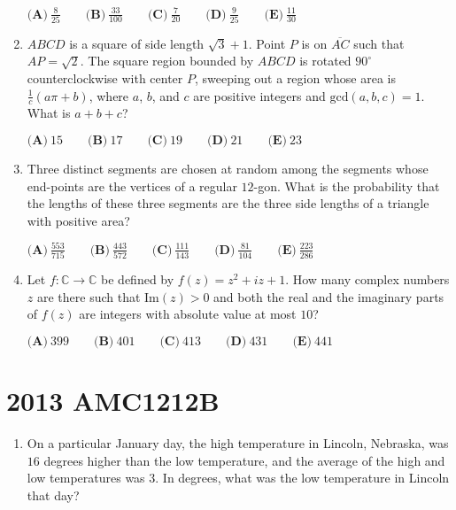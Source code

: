 \documentclass{article}
\begin{document}
\begin{enumerate}[label=\arabic*., itemsep=0.5em]
$ \textbf{(A)} \ \frac{8}{25} \qquad \textbf{(B)} \ \frac{33}{100} \qquad \textbf{(C)} \ \frac{7}{20} \qquad \textbf{(D)} \ \frac{9}{25} \qquad \textbf{(E)} \ \frac{11}{30}$\par \vspace{0.5em}\item $ ABCD$ is a square of side length $ \sqrt{3} + 1 $. Point $ P $ is on $ \overline{AC} $ such that $ AP = \sqrt{2} $. The square region bounded by $ ABCD $ is rotated $ 90^{\circ} $ counterclockwise with center $ P $, sweeping out a region whose area is $ \frac{1}{c} (a \pi + b) $, where $a $, $b$, and $ c $ are positive integers and $ \text{gcd}(a,b,c) = 1 $. What is $ a + b + c $?

$\textbf{(A)} \ 15 \qquad \textbf{(B)} \ 17 \qquad \textbf{(C)} \ 19 \qquad \textbf{(D)} \ 21 \qquad \textbf{(E)} \ 23 $\par \vspace{0.5em}\item Three distinct segments are chosen at random among the segments whose end-points are the vertices of a regular $12$-gon. What is the probability that the lengths of these three segments are the three side lengths of a triangle with positive area?

$ \textbf{(A)} \ \frac{553}{715} \qquad \textbf{(B)} \ \frac{443}{572} \qquad \textbf{(C)} \ \frac{111}{143} \qquad \textbf{(D)} \ \frac{81}{104} \qquad \textbf{(E)} \ \frac{223}{286}$\par \vspace{0.5em}\item Let $f : \mathbb{C} \to \mathbb{C} $ be defined by $ f(z) = z^2 + iz + 1 $. How many complex numbers $z $ are there such that $ \text{Im}(z) > 0 $ and both the real and the imaginary parts of $f(z)$ are integers with absolute value at most $ 10 $?

$ \textbf{(A)} \ 399 \qquad \textbf{(B)} \ 401 \qquad \textbf{(C)} \ 413 \qquad \textbf{(D)} \ 431 \qquad \textbf{(E)} \ 441 $\par \vspace{0.5em}\end{enumerate}\newpage\section*{2013 AMC1212B}\begin{enumerate}[label=\arabic*., itemsep=0.5em]\item On a particular January day, the high temperature in Lincoln, Nebraska, was $16$ degrees higher than the low temperature, and the average of the high and low temperatures was $3$. In degrees, what was the low temperature in Lincoln that day?


\end{enumerate}
\end{document}
